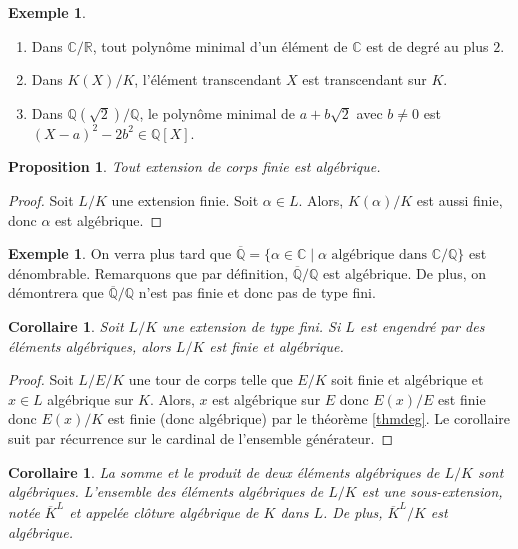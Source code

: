 \documentclass{article}
\newcommand{\Q}{\mathbb{Q}}
\newcommand{\R}{\mathbb{R}}
\newcommand{\C}{\mathbb{C}}
\theoremstyle{plain}
\newtheorem{proposition}[theorem]{Proposition}
\newtheorem{corollary}[theorem]{Corollaire}
\theoremstyle{definition}
\newtheorem{example}[theorem]{Exemple}
\theoremstyle{remark}
\begin{document}
\begin{example} \leavevmode
    \begin{enumerate}
        \item Dans $\C/\R$, tout polynôme minimal d'un élément de $\C$ est de degré au plus $2$.
        \item Dans $K(X)/K$, l'élément transcendant $X$ est transcendant sur $K$.
        \item Dans $\Q(\sqrt{2})/\Q$, le polynôme minimal de $a + b \sqrt{2}$ avec $b \ne 0$ est $(X-a)^2 - 2b^2 \in \Q[X]$.
    \end{enumerate}
\end{example}

\begin{proposition}
    Tout extension de corps finie est algébrique.
\end{proposition}

\begin{proof}
    Soit $L/K$ une extension finie. Soit $\alpha \in L$. Alors, $K(\alpha)/K$ est aussi finie, donc $\alpha$ est algébrique.
\end{proof}

\begin{example}
    On verra plus tard que $\overline{\Q} = \{\alpha \in \C \mid \alpha \text{ algébrique dans } \C/\Q\}$ est dénombrable. Remarquons que par définition, $\overline{\Q}/\Q$ est algébrique. De plus, on démontrera que $\overline{\Q}/\Q$ n'est pas finie et donc pas de type fini.
\end{example}

\begin{corollary}
    Soit $L/K$ une extension de type fini. Si $L$ est engendré par des éléments algébriques, alors $L/K$ est finie et algébrique.
\end{corollary}

\begin{proof}
    Soit $L/E/K$ une tour de corps telle que $E/K$ soit finie et algébrique et $x \in L$ algébrique sur $K$. Alors, $x$ est algébrique sur $E$ donc $E(x)/E$ est finie donc $E(x)/K$ est finie (donc algébrique) par le théorème \ref{thmdeg}. Le corollaire suit par récurrence sur le cardinal de l'ensemble générateur.
\end{proof}

\begin{corollary}
    La somme et le produit de deux éléments algébriques de $L/K$ sont algébriques. L'ensemble des éléments algébriques de $L/K$ est une sous-extension, notée $\overline{K}^L$ et appelée \emph{clôture algébrique de $K$ dans $L$}. De plus, $\overline{K}^L / K$ est algébrique.
\end{corollary}
\end{document}
